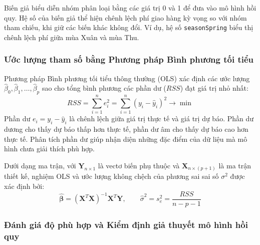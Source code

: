 	Biến giả biểu diễn nhóm phân loại bằng các giá trị 0 và 1 để đưa vào mô hình hồi quy. Hệ số của biến giả thể hiện chênh lệch phí giao hàng kỳ vọng so với nhóm tham chiếu, khi giữ các biến khác không đổi. Ví dụ, hệ số \texttt{seasonSpring} biểu thị chênh lệch phí giữa mùa Xuân và mùa Thu.
	
	\subsubsection{Ước lượng tham số bằng Phương pháp Bình phương tối tiểu }
	
	Phương pháp Bình phương tối tiểu thông thường (OLS)  xác định các ước lượng $\hat{\beta}_0, \hat{\beta}_1, \dots, \hat{\beta}_p$ sao cho tổng bình phương các phần dư ($RSS$) đạt giá trị nhỏ nhất:
	\begin{equation}
		RSS = \sum_{i=1}^{n} e_i^2 = \sum_{i=1}^{n} (y_i - \hat{y}_i)^2 \longrightarrow \min
	\end{equation}
	Phần dư $e_i=y_i-\hat{y}_i$ là chênh lệch giữa giá trị thực tế và giá trị dự báo. Phần dư dương cho thấy dự báo thấp hơn thực tế, phần dư âm cho thấy dự báo cao hơn thực tế. Phân tích phần dư giúp nhận diện những đặc điểm của dữ liệu mà mô hình chưa giải thích phù hợp.
	
	Dưới dạng ma trận, với $\mathbf{Y}_{n \times 1}$ là vectơ biến phụ thuộc và $\mathbf{X}_{n \times (p+1)}$ là ma trận thiết kế, nghiệm OLS và ước lượng không chệch của phương sai sai số $\sigma^2$ được xác định bởi:
	\begin{equation}
		\hat{\boldsymbol{\beta}} = (\mathbf{X}^T \mathbf{X})^{-1} \mathbf{X}^T \mathbf{Y}, \qquad \hat{\sigma}^2 = s_e^2 = \frac{RSS}{n - p - 1}
	\end{equation}
	
	\subsubsection{Đánh giá độ phù hợp và Kiểm định giả thuyết mô hình hồi quy}
	
